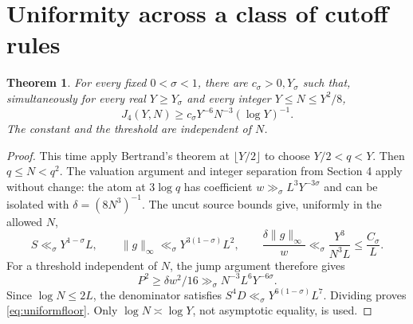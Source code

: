\documentclass[11pt,a4paper]{article}
\newtheorem{theorem}{Theorem}[section]
\theoremstyle{definition}
\theoremstyle{remark}
\begin{document}
\section{Uniformity across a class of cutoff rules}

\begin{theorem}\label{thm:uniformcutoff}
For every fixed \(0<\sigma<1\), there are \(c_\sigma>0,Y_\sigma\)
such that, simultaneously for every real \(Y\ge Y_\sigma\) and
every integer \(Y\le N\le Y^2/8\),
\begin{equation}
 J_4(Y,N)\ge c_\sigma Y^{-6}N^{-3}(\log Y)^{-1}.
 \label{eq:uniformfloor}
\end{equation}
The constant and the threshold are independent of \(N\).
\end{theorem}
\begin{proof}
This time apply Bertrand's theorem at \(\lfloor Y/2\rfloor\) to
choose \(Y/2<q<Y\). Then \(q\le N<q^2\). The valuation argument
and integer separation from Section 4 apply without change:
the atom at \(3\log q\) has coefficient
\(w\gg_\sigma L^3Y^{-3\sigma}\) and can be isolated with
\(\delta=(8N^3)^{-1}\).
The uncut source bounds give, uniformly in the allowed \(N\),
\[
 S\ll_\sigma Y^{1-\sigma}L,\qquad
 \|g\|_\infty\ll_\sigma Y^{3(1-\sigma)}L^2,\qquad
 \frac{\delta\|g\|_\infty}{w}
 \ll_\sigma\frac{Y^3}{N^3L}\le \frac{C_\sigma}{L}.
\]
For a threshold independent of \(N\), the jump argument therefore
gives
\[
 P^2\ge\delta w^2/16
 \gg_\sigma N^{-3}L^6Y^{-6\sigma}.
\]
Since \(\log N\le2L\), the denominator satisfies
\(S^4D\ll_\sigma Y^{6(1-\sigma)}L^7\).
Dividing proves \eqref{eq:uniformfloor}.
Only \(\log N\asymp\log Y\), not asymptotic equality, is used.
\end{proof}
\end{document}
